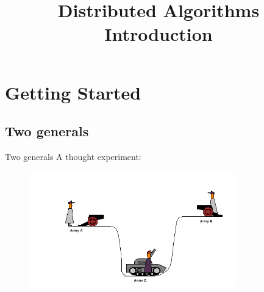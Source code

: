 
\title[DS - Introduction]{\textbf{Distributed Algorithms}\\Introduction}

\graphicspath{{figs/01/}}



\FrameTitle{}

\FrameContent

\section{Getting Started}

\subsection{Two generals}

\begin{frame}{Two generals}
A thought experiment:	
\begin{center}
\begin{figure} 
\includegraphics[width=0.8\textwidth]{two-generals.png}
\end{figure}
\end{center}

\end{frame}
	
